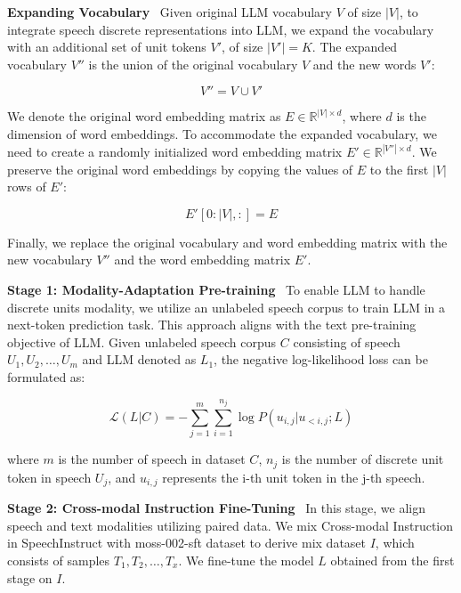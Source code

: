 \noindent\textbf{Expanding Vocabulary}~
Given original LLM vocabulary $V$ of size $|V|$, to integrate speech discrete representations into LLM, we expand the vocabulary with an additional set of unit tokens $V'$, of size $|V'|=K$. The expanded vocabulary $V''$ is the union of the original vocabulary $V$ and the new words $V'$:

\begin{equation}
V'' = V \cup V'
\end{equation}

\noindent We denote the original word embedding matrix as $E \in \mathbb{R}^{|V| \times d}$, where $d$ is the dimension of word embeddings. To accommodate the expanded vocabulary, we need to create a randomly initialized word embedding matrix $E' \in \mathbb{R}^{|V''| \times d}$.
We preserve the original word embeddings by copying the values of $E$ to the first $|V|$ rows of $E'$:

\begin{equation}
E'[0:|V|, :] = E
\end{equation}

\noindent Finally, we replace the original vocabulary and word embedding matrix  with the new vocabulary $V''$ and the word embedding matrix $E'$. 

\noindent\textbf{Stage 1: Modality-Adaptation Pre-training}~
To enable LLM to handle discrete units modality, we utilize an unlabeled speech corpus to train LLM in a next-token prediction task. This approach aligns with the text pre-training objective of LLM.
Given unlabeled speech corpus $C$ consisting of speech $U_1, U_2, \ldots, U_m$ and LLM denoted as $L_1$, the negative log-likelihood loss can be formulated as:

\begin{equation}
\mathcal{L}(L|C) = -\sum_{j=1}^{m}\sum_{i=1}^{n_j} \log P(u_{i,j} | u_{<i,j}; L)
\end{equation}

\noindent where $m$ is the number of speech in dataset $C$, $n_j$ is the number of discrete unit token in speech $U_j$, and $u_{i,j}$ represents the i-th unit token in the j-th speech.

\noindent\textbf{Stage 2: Cross-modal Instruction Fine-Tuning}~
In this stage, we align speech and text modalities utilizing paired data. We mix Cross-modal Instruction in SpeechInstruct with moss-002-sft dataset to derive mix dataset $I$, which consists of samples $T_1, T_2, \ldots, T_x$. We fine-tune the model $L$ obtained from the first stage on $I$.

